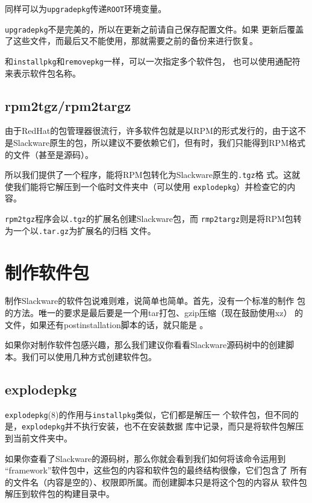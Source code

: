 同样可以为\texttt{upgradepkg}传递\texttt{ROOT}环境变量。

\texttt{upgradepkg}不是完美的，所以在更新之前请自己保存配置文件。如果
更新后覆盖了这些文件，而最后又不能使用，那就需要之前的备份来进行恢复。

和\texttt{installpkg}和\texttt{removepkg}一样，可以一次指定多个软件包，
也可以使用通配符来表示软件包名称。

\subsection{rpm2tgz/rpm2targz}
\label{sec:packageManagement:utilities:rpm2}
由于RedHat的包管理器很流行，许多软件包就是以RPM的形式发行的，由于这不
是Slackware原生的包，所以建议不要依赖它们，但有时，我们只能得到RPM格式
的文件（甚至是源码）。

所以我们提供了一个程序，能将RPM包转化为Slackware原生的\texttt{.tgz}格
式。这就使我们能将它解压到一个临时文件夹中（可以使用
\texttt{explodepkg}）并检查它的内容。

\texttt{rpm2tgz}程序会以\texttt{.tgz}的扩展名创建Slackware包，而
\texttt{rmp2targz}则是将RPM包转为一个以\texttt{.tar.gz}为扩展名的归档
文件。

\section{制作软件包}
\label{sec:packageManagement:makingPackages}
制作Slackware的软件包说难则难，说简单也简单。首先，没有一个标准的制作
包的方法。唯一的要求是最后要是一个用tar打包、gzip压缩（现在鼓励使用xz）
的文件，如果还有postinstallation脚本的话，就只能是
。

如果你对制作软件包感兴趣，那么我们建议你看看Slackware源码树中的创建脚
本。我们可以使用几种方式创建软件包。


\subsection{explodepkg}
\label{sec:packageManagement:makingPackages:explodepkg}
\texttt{explodepkg}(8)的作用与\texttt{installpkg}类似，它们都是解压一
个软件包，但不同的是，\texttt{explodepkg}并不执行安装，也不在安装数据
库中记录，而只是将软件包解压到当前文件夹中。

如果你查看了Slackware的源码树，那么你就会看到我们如何将该命令运用到
``framework''软件包中，这些包的内容和软件包的最终结构很像，它们包含了
所有的文件名（内容是空的）、权限即所属。而创建脚本只是将这个包的内容从
软件包解压到软件包的构建目录中。

